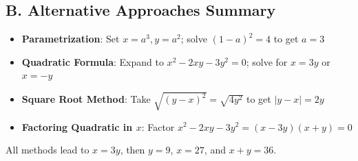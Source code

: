 \documentclass[12pt]{article}
\begin{document}
\begin{solutionbox}
\subsection*{B. Alternative Approaches Summary}
\begin{itemize}[leftmargin=*]
    \item \textbf{Parametrization}: Set $x = a^3, y = a^2$; solve $(1-a)^2 = 4$ to get $a = 3$
    \item \textbf{Quadratic Formula}: Expand to $x^2 - 2xy - 3y^2 = 0$; solve for $x = 3y$ or $x = -y$
    \item \textbf{Square Root Method}: Take $\sqrt{(y-x)^2} = \sqrt{4y^2}$ to get $|y-x| = 2y$
    \item \textbf{Factoring Quadratic in $x$}: Factor $x^2 - 2xy - 3y^2 = (x-3y)(x+y) = 0$
\end{itemize}

All methods lead to $x = 3y$, then $y = 9$, $x = 27$, and $x+y = 36$.
\end{solutionbox}
\end{document}
